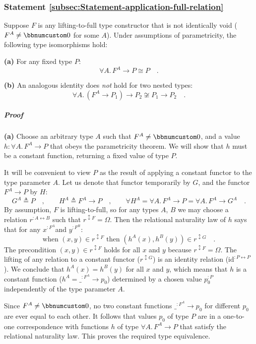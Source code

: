 \subsubsection{Statement \label{subsec:Statement-application-full-relation}\ref{subsec:Statement-application-full-relation}}

Suppose $F$ is any lifting-to-full type constructor that is not identically
void ($F^{A}\neq\bbnum 0$ for some $A$). Under assumptions of parametricity,
the following type isomorphisms hold:

\textbf{(a)} For any fixed type $P$:
\[
\forall A.\,F^{A}\rightarrow P\cong P\quad.
\]

\textbf{(b)} An analogous identity does \emph{not} hold for two nested
types:
\[
\forall A.\,(F^{A}\rightarrow P_{1})\rightarrow P_{2}\not\cong P_{1}\rightarrow P_{2}\quad.
\]


\subparagraph{Proof}

\textbf{(a)} Choose an arbitrary type $A$ such that $F^{A}\neq\bbnum 0$,
and a value $h:\forall A.\,F^{A}\rightarrow P$ that obeys the parametricity
theorem. We will show that $h$ must be a constant function, returning
a fixed value of type $P$.

It will be convenient to view $P$ as the result of applying a constant
functor to the type parameter $A$. Let us denote that functor temporarily
by $G$, and the functor $F^{A}\rightarrow P$ by $H$:
\[
G^{A}\triangleq P\quad,\quad\quad H^{A}\triangleq F^{A}\rightarrow P\quad,\quad\quad\forall H^{A}=\forall A.\,F^{A}\rightarrow P=\forall A.\,F^{A}\rightarrow G^{A}\quad.
\]
By assumption, $F$ is lifting-to-full, so for any types $A$, $B$
we may choose a relation $r^{:A\leftrightarrow B}$ such that $r^{\updownarrow F}=\Omega$.
Then the relational naturality law of $h$ says that for any $x^{:F^{A}}$and
$y^{:F^{B}}$:
\[
\text{when }(x,y)\in r^{\updownarrow F}\text{ then }(h^{A}(x),h^{B}(y))\in r^{\updownarrow G}\quad.
\]
The precondition $(x,y)\in r^{\updownarrow F}$ holds for all $x$
and $y$ because $r^{\updownarrow F}=\Omega$. The lifting of any
relation to a constant functor ($r^{\updownarrow G}$) is an identity
relation ($\text{id}^{:P\leftrightarrow P}$). We conclude that $h^{A}(x)=h^{B}(y)$
for all $x$ and $y$, which means that $h$ is a constant function
($h^{A}=\_^{:F^{A}}\rightarrow p_{0}$) determined by a chosen value
$p_{0}^{:P}$ independently of the type parameter $A$. 

Since $F^{A}\neq\bbnum 0$, no two constant functions $\_^{:F^{A}}\rightarrow p_{0}$
for different $p_{0}$ are ever equal to each other. It follows that
values $p_{0}$ of type $P$ are in a one-to-one correspondence with
functions $h$ of type $\forall A.\,F^{A}\rightarrow P$ that satisfy
the relational naturality law. This proves the required type equivalence.


